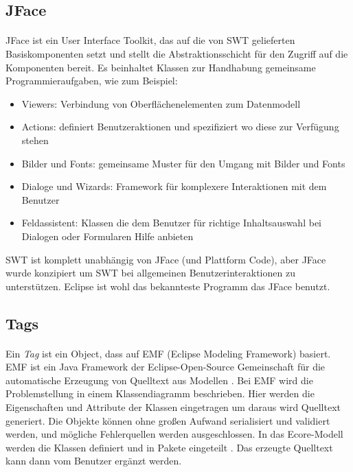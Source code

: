 \subsection{JFace}
\paragraph{}
JFace ist ein User Interface Toolkit, das auf die von SWT gelieferten Basiskomponenten setzt und stellt die Abstraktionsschicht für den Zugriff auf die Komponenten bereit. Es beinhaltet Klassen zur Handhabung gemeinsame Programmieraufgaben, wie zum Beispiel:


\begin{itemize}
\item Viewers: Verbindung von Oberflächenelementen zum Datenmodell
\item Actions: definiert Benutzeraktionen und spezifiziert wo diese zur Verfügung stehen
\item Bilder und Fonts: gemeinsame Muster für den Umgang mit Bilder und Fonts
\item Dialoge und Wizards: Framework für komplexere Interaktionen mit dem Benutzer
\item Feldassistent: Klassen die dem Benutzer für richtige Inhaltsauswahl bei Dialogen oder Formularen Hilfe anbieten
\end{itemize}


SWT ist komplett unabhängig von JFace (und Plattform Code), aber JFace wurde konzipiert um SWT  bei allgemeinen Benutzerinteraktionen zu unterstützen. Eclipse ist wohl das bekannteste Programm das JFace benutzt.\cite{EclipseHelp}\\



\subsection{Tags}\label{sub.Tags}
\paragraph{}

Ein \textit{Tag} ist ein Object, dass auf EMF (Eclipse Modeling Framework) basiert. EMF ist ein Java Framework der Eclipse-Open-Source Gemeinschaft für die automatische Erzeugung von Quelltext aus Modellen \cite{EclipseRCP}.  Bei EMF wird die Problemstellung in einem Klassendiagramm beschrieben. Hier werden die Eigenschaften und Attribute der Klassen eingetragen um daraus wird Quelltext generiert. Die Objekte können ohne großen Aufwand serialisiert und validiert werden, und mögliche Fehlerquellen werden ausgeschlossen. In das Ecore-Modell werden die Klassen definiert und in Pakete eingeteilt . Das erzeugte Quelltext kann dann vom Benutzer ergänzt werden.\\


